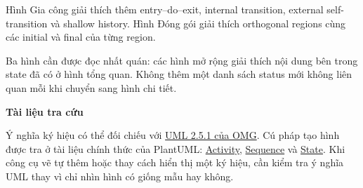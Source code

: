 \documentclass[12pt,a4paper]{article}
\newcommand{\point}[1]{\par\medskip\noindent\textbf{#1}\par\nobreak\smallskip}
\begin{document}
Hình Gia công giải thích thêm entry--do--exit, internal transition, external self-transition và shallow history. Hình Đóng gói giải thích orthogonal regions cùng các initial và final của từng region.

Ba hình cần được đọc nhất quán: các hình mở rộng giải thích nội dung bên trong state đã có ở hình tổng quan. Không thêm một danh sách status mới không liên quan mỗi khi chuyển sang hình chi tiết.

\point{Tài liệu tra cứu}
Ý nghĩa ký hiệu có thể đối chiếu với \href{https://www.omg.org/spec/UML/2.5.1}{UML 2.5.1 của OMG}. Cú pháp tạo hình được tra ở tài liệu chính thức của PlantUML:
\href{https://plantuml.com/activity-diagram-beta}{Activity},
\href{https://plantuml.com/sequence-diagram}{Sequence} và
\href{https://plantuml.com/state-diagram}{State}.
Khi công cụ vẽ tự thêm hoặc thay cách hiển thị một ký hiệu, cần kiểm tra ý nghĩa UML thay vì chỉ nhìn hình có giống mẫu hay không.
\end{document}
